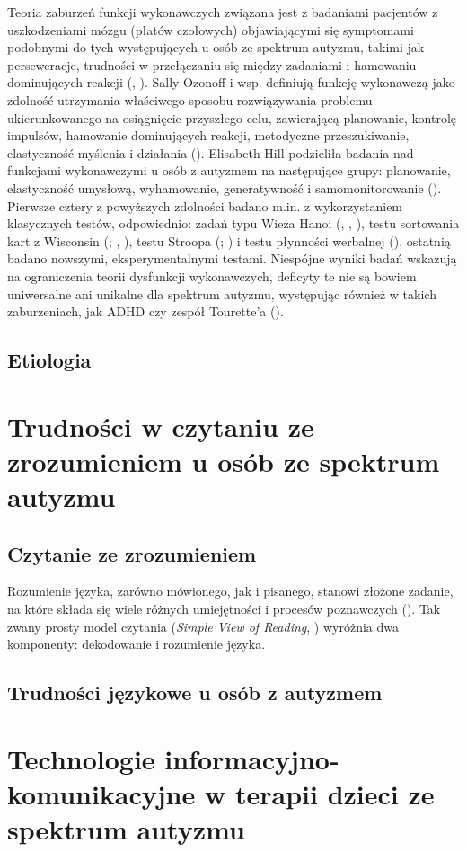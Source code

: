     Teoria zaburzeń funkcji wykonawczych związana jest z badaniami pacjentów z uszkodzeniami mózgu (płatów czołowych) objawiającymi się symptomami podobnymi do tych występujących u osób ze spektrum autyzmu, takimi jak perseweracje, trudności w przełączaniu się między zadaniami i hamowaniu dominujących reakcji (\cite{frith2008autyzm}, \cite{russell1997autism}).
    Sally Ozonoff i wsp. definiują funkcję wykonawczą jako zdolność utrzymania właściwego sposobu rozwiązywania problemu ukierunkowanego na osiągnięcie przyszłego celu, zawierającą planowanie, kontrolę impulsów, hamowanie dominujących reakcji, metodyczne przeszukiwanie, elastyczność myślenia i działania (\cite{ozonoff1991executive}).
    Elisabeth Hill podzieliła badania nad funkcjami wykonawczymi u osób z autyzmem na następujące grupy: planowanie, elastyczność umysłową, wyhamowanie, generatywność i samomonitorowanie (\cite{hill2004evaluating}).
    Pierwsze cztery z powyższych zdolności badano m.in. z wykorzystaniem klasycznych testów, odpowiednio: zadań typu Wieża Hanoi (\cite{ozonoff1991executive}, \cite{bennetto1996intact}, \cite{ozonoff1999brief}), testu sortowania kart z Wisconsin (\cite{grant1948behavioral}; \cite{ozonoff1991executive}, \cite{ozonoff1999brief}), testu Stroopa (\cite{stroop1935studies}; \cite{ozonoff1999brief}) i testu płynności werbalnej (\cite{turner1999generating}), ostatnią badano nowszymi, eksperymentalnymi testami. 
    Niespójne wyniki badań wskazują na ograniczenia teorii dysfunkcji wykonawczych, deficyty te nie są bowiem uniwersalne ani unikalne dla spektrum autyzmu, występując również w takich zaburzeniach, jak ADHD czy zespół Tourette'a (\cite{hill2004evaluating}).
    
    \subsection{Etiologia}

\section{Trudności w czytaniu ze zrozumieniem u osób ze spektrum autyzmu}

    \subsection{Czytanie ze zrozumieniem}
     Rozumienie języka, zarówno mówionego, jak i pisanego, stanowi złożone zadanie, na które składa się wiele różnych umiejętności i procesów poznawczych (\cite{cain2008children}). Tak zwany prosty model czytania (\emph{Simple View of Reading}, \cite{hoover1990simple}) wyróżnia dwa komponenty: dekodowanie i rozumienie języka.
     
    \subsection{Trudności językowe u osób z autyzmem}
    

\section{Technologie informacyjno-komunikacyjne w terapii dzieci ze spektrum autyzmu}